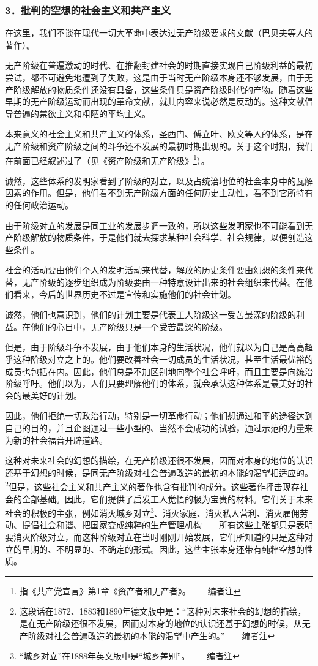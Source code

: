 \documentclass[UTF8,zihao=-4,a4paper]{ctexart}
\begin{document}
\subsubsection*{3．批判的空想的社会主义和共产主义}
在这里，我们不谈在现代一切大革命中表达过无产阶级要求的文献（巴贝夫等人的著作）。\par
无产阶级在普遍激动的时代、在推翻封建社会的时期直接实现自己阶级利益的最初尝试，都不可避免地遭到了失败，这是由于当时无产阶级本身还不够发展，由于无产阶级解放的物质条件还没有具备，这些条件只是资产阶级时代的产物。随着这些早期的无产阶级运动而出现的革命文献，就其内容来说必然是反动的。这种文献倡导普遍的禁欲主义和粗陋的平均主义。\par
本来意义的社会主义和共产主义的体系，圣西门、傅立叶、欧文等人的体系，是在无产阶级和资产阶级之间的斗争还不发展的最初时期出现的。关于这个时期，我们在前面已经叙述过了（见《资产阶级和无产阶级》\footnote{指《共产党宣言》第1章《资产者和无产者》。——编者注}）。\par
诚然，这些体系的发明家看到了阶级的对立，以及占统治地位的社会本身中的瓦解因素的作用。但是，他们看不到无产阶级方面的任何历史主动性，看不到它所特有的任何政治运动。\par
由于阶级对立的发展是同工业的发展步调一致的，所以这些发明家也不可能看到无产阶级解放的物质条件，于是他们就去探求某种社会科学、社会规律，以便创造这些条件。\par
社会的活动要由他们个人的发明活动来代替，解放的历史条件要由幻想的条件来代替，无产阶级的逐步组织成为阶级要由一种特意设计出来的社会组织来代替。在他们看来，今后的世界历史不过是宣传和实施他们的社会计划。\par
诚然，他们也意识到，他们的计划主要是代表工人阶级这一受苦最深的阶级的利益。在他们的心目中，无产阶级只是一个受苦最深的阶级。\par
但是，由于阶级斗争不发展，由于他们本身的生活状况，他们就以为自己是高高超乎这种阶级对立之上的。他们要改善社会一切成员的生活状况，甚至生活最优裕的成员也包括在内。因此，他们总是不加区别地向整个社会呼吁，而且主要是向统治阶级呼吁。他们以为，人们只要理解他们的体系，就会承认这种体系是最美好的社会的最美好的计划。\par
因此，他们拒绝一切政治行动，特别是一切革命行动；他们想通过和平的途径达到自己的目的，并且企图通过一些小型的、当然不会成功的试验，通过示范的力量来为新的社会福音开辟道路。\par
这种对未来社会的幻想的描绘，在无产阶级还很不发展，因而对本身的地位的认识还基于幻想的时候，是同无产阶级对社会普遍改造的最初的本能的渴望相适应的。\footnote{这段话在1872、1883和1890年德文版中是：“这种对未来社会的幻想的描绘，是在无产阶级还很不发展，因而对本身的地位的认识还基于幻想的时候，从无产阶级对社会普遍改造的最初的本能的渴望中产生的。”——编者注}但是，这些社会主义和共产主义的著作也含有批判的成分。这些著作抨击现存社会的全部基础。因此，它们提供了启发工人觉悟的极为宝贵的材料。它们关于未来社会的积极的主张，例如消灭城乡对立\footnote{“城乡对立”在1888年英文版中是“城乡差别”。——编者注}、消灭家庭、消灭私人营利、消灭雇佣劳动、提倡社会和谐、把国家变成纯粹的生产管理机构——所有这些主张都只是表明要消灭阶级对立，而这种阶级对立在当时刚刚开始发展，它们所知道的只是这种对立的早期的、不明显的、不确定的形式。因此，这些主张本身还带有纯粹空想的性质。\par
\end{document}
